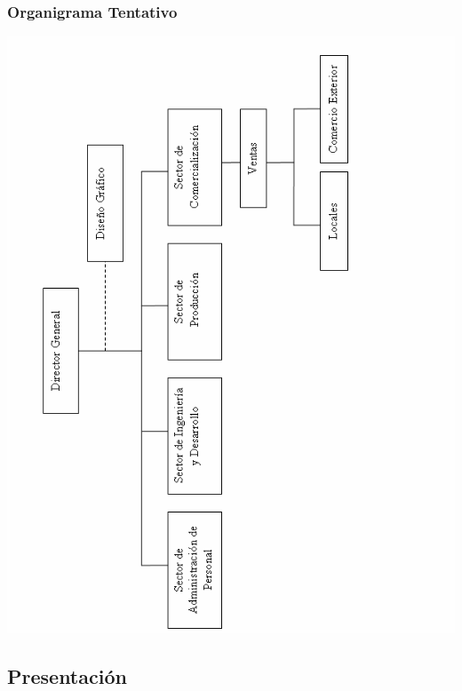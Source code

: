 \documentclass[a4paper,10pt,titlepage]{article}
\begin{document}
\subsubsection*{\textbf{Organigrama Tentativo}}
\begin {center}
\includegraphics[width=400pt]{./OrganigramaTentativo.png}
\end{center}

\newpage
\vspace*{\fill}
\begin{center}
\begingroup
\titlerule
\vspace{1cm}
\section{Presentaci\'on}
\vspace{1cm}
\titlerule
\endgroup
\end{center}
\vspace*{\fill}
\end{document}
